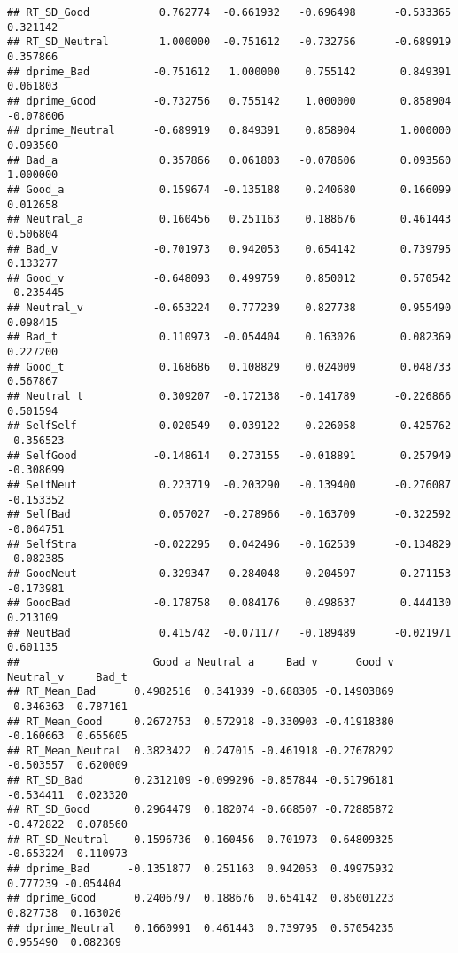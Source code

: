 \documentclass[man]{apa6}
\begin{document}
\begin{verbatim}
## RT_SD_Good           0.762774  -0.661932   -0.696498      -0.533365  0.321142
## RT_SD_Neutral        1.000000  -0.751612   -0.732756      -0.689919  0.357866
## dprime_Bad          -0.751612   1.000000    0.755142       0.849391  0.061803
## dprime_Good         -0.732756   0.755142    1.000000       0.858904 -0.078606
## dprime_Neutral      -0.689919   0.849391    0.858904       1.000000  0.093560
## Bad_a                0.357866   0.061803   -0.078606       0.093560  1.000000
## Good_a               0.159674  -0.135188    0.240680       0.166099  0.012658
## Neutral_a            0.160456   0.251163    0.188676       0.461443  0.506804
## Bad_v               -0.701973   0.942053    0.654142       0.739795  0.133277
## Good_v              -0.648093   0.499759    0.850012       0.570542 -0.235445
## Neutral_v           -0.653224   0.777239    0.827738       0.955490  0.098415
## Bad_t                0.110973  -0.054404    0.163026       0.082369  0.227200
## Good_t               0.168686   0.108829    0.024009       0.048733  0.567867
## Neutral_t            0.309207  -0.172138   -0.141789      -0.226866  0.501594
## SelfSelf            -0.020549  -0.039122   -0.226058      -0.425762 -0.356523
## SelfGood            -0.148614   0.273155   -0.018891       0.257949 -0.308699
## SelfNeut             0.223719  -0.203290   -0.139400      -0.276087 -0.153352
## SelfBad              0.057027  -0.278966   -0.163709      -0.322592 -0.064751
## SelfStra            -0.022295   0.042496   -0.162539      -0.134829 -0.082385
## GoodNeut            -0.329347   0.284048    0.204597       0.271153 -0.173981
## GoodBad             -0.178758   0.084176    0.498637       0.444130  0.213109
## NeutBad              0.415742  -0.071177   -0.189489      -0.021971  0.601135
##                     Good_a Neutral_a     Bad_v      Good_v Neutral_v     Bad_t
## RT_Mean_Bad      0.4982516  0.341939 -0.688305 -0.14903869 -0.346363  0.787161
## RT_Mean_Good     0.2672753  0.572918 -0.330903 -0.41918380 -0.160663  0.655605
## RT_Mean_Neutral  0.3823422  0.247015 -0.461918 -0.27678292 -0.503557  0.620009
## RT_SD_Bad        0.2312109 -0.099296 -0.857844 -0.51796181 -0.534411  0.023320
## RT_SD_Good       0.2964479  0.182074 -0.668507 -0.72885872 -0.472822  0.078560
## RT_SD_Neutral    0.1596736  0.160456 -0.701973 -0.64809325 -0.653224  0.110973
## dprime_Bad      -0.1351877  0.251163  0.942053  0.49975932  0.777239 -0.054404
## dprime_Good      0.2406797  0.188676  0.654142  0.85001223  0.827738  0.163026
## dprime_Neutral   0.1660991  0.461443  0.739795  0.57054235  0.955490  0.082369

\end{verbatim}
\end{document}
